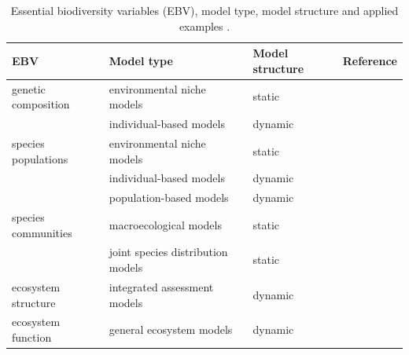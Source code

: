 \begin{table}[]
\centering
\caption{Essential biodiversity variables (EBV), model type, model structure and applied examples \citep[based on][]{zurell_spatially-explicit_2021}.}
\label{ch1:ebvmodels}
\begin{tabularx}{\textwidth}{lllY}
\toprule
EBV & Model type &  Model structure & Reference \\
\bottomrule
genetic composition & environmental niche models & static & \citep{sillero_distribution_2020} \\
 & individual-based models & dynamic & \citep{cornell_unified_2019} \\
species populations & environmental niche models & static & \citep{kapitza_assessing_2021, struebig_anticipated_2015} \\
 & individual-based models & dynamic & \citep{deangelis_individual-based_2014} \\
 & population-based models & dynamic & \citep{cadenhead_climate_2016, marshall_quantifying_2021} \\
species communities & macroecological models & static & \citep{newbold_global_2015} \\
 & joint species distribution models & static & \citep{pollock_understanding_2014} \\
ecosystem structure & integrated assessment models & dynamic & \citep{fricko_marker_2017, kriegler_fossil-fueled_2017} \\
ecosystem function & general ecosystem models & dynamic & \citep{harfoot_emergent_2014} \\
\bottomrule
\end{tabularx}
\end{table}

